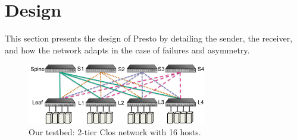 \section{Design}
\label{sec:design}

This section presents the design of Presto by detailing
the sender, the receiver, and how the network
adapts in the case of failures and asymmetry.


%
%
%
%
%
%
%

\begin{figure}[!t]
        \centering
  \includegraphics[width=0.7\textwidth,height=0.17\textwidth]{presto/figures/macro/macro_evaluation_topology_refined.pdf}
        \caption{Our testbed: 2-tier Clos network with 16 hosts.}
        \label{macro_evaluation_topology}
\end{figure}

